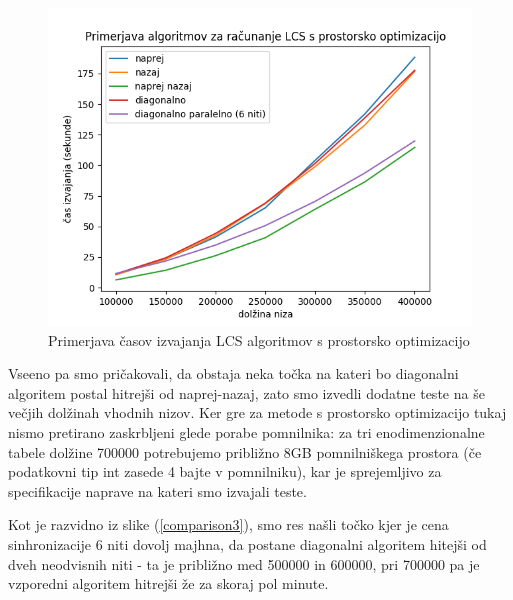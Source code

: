 \documentclass[a4paper,12pt,openright]{book}
\begin{document}
\begin{figure}[htb]
\begin{center}
\includegraphics[width=1.0\textwidth]{plots/LCSspace.png}
\end{center}
\caption{Primerjava časov izvajanja LCS algoritmov s prostorsko optimizacijo}
\label{comparison2}
\end{figure}

\bigskip 
Vseeno pa smo pričakovali, da obstaja neka točka na kateri bo diagonalni algoritem postal hitrejši od naprej-nazaj, zato smo izvedli dodatne teste na še večjih dolžinah vhodnih nizov. Ker gre za metode s prostorsko optimizacijo tukaj nismo pretirano zaskrbljeni glede porabe pomnilnika: za tri enodimenzionalne tabele dolžine 700000 potrebujemo približno 8GB pomnilniškega prostora (če podatkovni tip int zasede 4 bajte v pomnilniku), kar je sprejemljivo za specifikacije naprave na kateri smo izvajali teste. 

Kot je razvidno iz slike (\ref{comparison3}), smo res našli točko kjer je cena sinhronizacije 6 niti dovolj majhna, da postane diagonalni algoritem hitejši od dveh neodvisnih niti - ta je približno med 500000 in 600000, pri 700000 pa je vzporedni algoritem hitrejši že za skoraj pol minute. 
\end{document}
